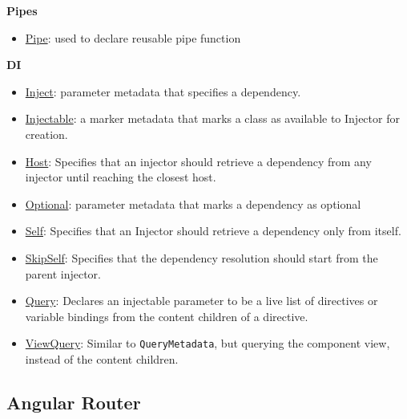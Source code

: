 \documentclass[12pt,]{article}
\providecommand{\tightlist}{%
  \setlength{\itemsep}{0pt}\setlength{\parskip}{0pt}}
\begin{document}
\textbf{Pipes}

\begin{itemize}
\tightlist
\item
  \href{https://angular.io/docs/ts/latest/api/core/PipeMetadata-class.html}{Pipe}:
  used to declare reusable pipe function
\end{itemize}

\textbf{DI}

\begin{itemize}
\tightlist
\item
  \href{https://angular.io/docs/ts/latest/api/core/InjectMetadata-class.html}{Inject}:
  parameter metadata that specifies a dependency.
\item
  \href{https://angular.io/docs/ts/latest/api/core/InjectableMetadata-class.html}{Injectable}:
  a marker metadata that marks a class as available to Injector for
  creation.
\item
  \href{https://angular.io/docs/ts/latest/api/core/HostMetadata-class.html}{Host}:
  Specifies that an injector should retrieve a dependency from any
  injector until reaching the closest host.
\item
  \href{https://angular.io/docs/ts/latest/api/core/OptionalMetadata-class.html}{Optional}:
  parameter metadata that marks a dependency as optional
\item
  \href{https://angular.io/docs/ts/latest/api/core/SelfMetadata-class.html}{Self}:
  Specifies that an Injector should retrieve a dependency only from
  itself.
\item
  \href{https://angular.io/docs/ts/latest/api/core/SkipSelfMetadata-class.html}{SkipSelf}:
  Specifies that the dependency resolution should start from the parent
  injector.
\item
  \href{https://angular.io/docs/ts/latest/api/core/QueryMetadata-class.html}{Query}:
  Declares an injectable parameter to be a live list of directives or
  variable bindings from the content children of a directive.
\item
  \href{https://angular.io/docs/ts/latest/api/core/ViewQueryMetadata-class.html}{ViewQuery}:
  Similar to \texttt{QueryMetadata}, but querying the component view,
  instead of the content children.
\end{itemize}

\subsection{Angular Router}\label{angular-router}
\end{document}
